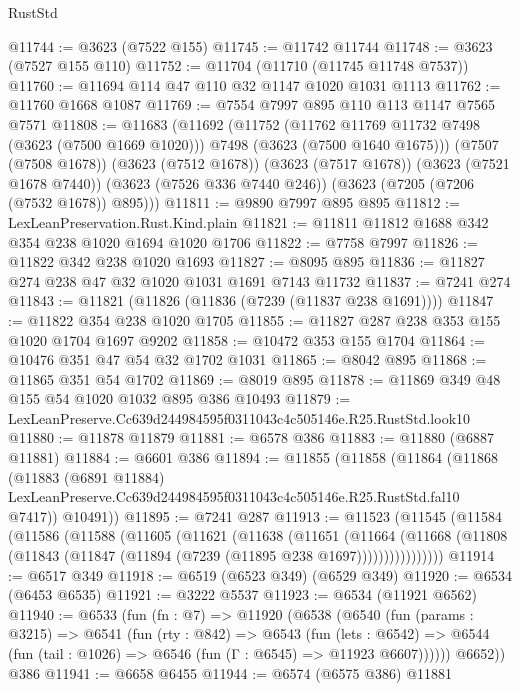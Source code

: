 \begin{lexlean}{RustStd}
\begin{coremodule}
@11744 := @3623 (@7522 @155)
@11745 := @11742 @11744
@11748 := @3623 (@7527 @155 @110)
@11752 := @11704 (@11710 (@11745 @11748 @7537))
@11760 := @11694 @114 @47 @110 @32 @1147 @1020 @1031 @1113
@11762 := @11760 @1668 @1087
@11769 := @7554 @7997 @895 @110 @113 @1147 @7565 @7571
@11808 := @11683
    (@11692
      (@11752
        (@11762 @11769 @11732 @7498 (@3623 (@7500 @1669 @1020)))
        @7498
        (@3623 (@7500 @1640 @1675)))
      (@7507 (@7508 @1678))
      (@3623 (@7512 @1678))
      (@3623 (@7517 @1678))
      (@3623 (@7521 @1678 @7440))
      (@3623 (@7526 @336 @7440 @246))
      (@3623 (@7205 (@7206 (@7532 @1678)) @895)))
@11811 := @9890 @7997 @895 @895
@11812 := LexLeanPreservation.Rust.Kind.plain
@11821 := @11811 @11812 @1688 @342 @354 @238 @1020 @1694 @1020 @1706
@11822 := @7758 @7997
@11826 := @11822 @342 @238 @1020 @1693
@11827 := @8095 @895
@11836 := @11827 @274 @238 @47 @32 @1020 @1031 @1691 @7143 @11732
@11837 := @7241 @274
@11843 := @11821 (@11826 (@11836 (@7239 (@11837 @238 @1691))))
@11847 := @11822 @354 @238 @1020 @1705
@11855 := @11827 @287 @238 @353 @155 @1020 @1704 @1697 @9202
@11858 := @10472 @353 @155 @1704
@11864 := @10476 @351 @47 @54 @32 @1702 @1031
@11865 := @8042 @895
@11868 := @11865 @351 @54 @1702
@11869 := @8019 @895
@11878 := @11869 @349 @48 @155 @54 @1020 @1032 @895 @386 @10493
@11879 := LexLeanPreserve.Cc639d244984595f0311043c4c505146e.R25.RustStd.look10
@11880 := @11878 @11879
@11881 := @6578 @386
@11883 := @11880 (@6887 @11881)
@11884 := @6601 @386
@11894 := @11855
    (@11858
      (@11864
        (@11868
          (@11883
            (@6891 @11884)
            LexLeanPreserve.Cc639d244984595f0311043c4c505146e.R25.RustStd.fal10
            @7417))
        @10491))
@11895 := @7241 @287
@11913 := @11523
    (@11545
      (@11584
        (@11586
          (@11588
            (@11605
              (@11621
                (@11638
                  (@11651
                    (@11664
                      (@11668
                        (@11808 (@11843 (@11847 (@11894 (@7239 (@11895 @238 @1697))))))))))))))))
@11914 := @6517 @349
@11918 := @6519 (@6523 @349) (@6529 @349)
@11920 := @6534 (@6453 @6535)
@11921 := @3222 @5537
@11923 := @6534 (@11921 @6562)
@11940 := @6533
    (fun (fn : @7) =>
    @11920
      (@6538
        (@6540
          (fun (params : @3215) =>
          @6541
            (fun (rty : @842) =>
            @6543
              (fun (lets : @6542) =>
              @6544 (fun (tail : @1026) => @6546 (fun (Γ : @6545) => @11923 @6607))))))
        @6652))
    @386
@11941 := @6658 @6455
@11944 := @6574 (@6575 @386) @11881

\end{coremodule}
\end{lexlean}
